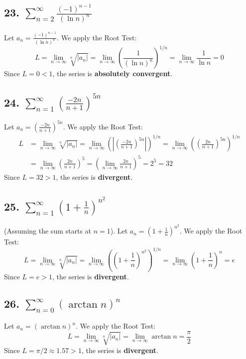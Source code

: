 \documentclass{article}
\begin{document}
\subsection*{23. $\sum_{n=2}^{\infty} \frac{(-1)^{n-1}}{(\ln n)^n}$}
Let $a_n = \frac{(-1)^{n-1}}{(\ln n)^n}$. We apply the Root Test:
\[ L = \lim_{n \to \infty} \sqrt[n]{|a_n|} = \lim_{n \to \infty} \left( \frac{1}{(\ln n)^n} \right)^{1/n} = \lim_{n \to \infty} \frac{1}{\ln n} = 0 \]
Since $L = 0 < 1$, the series is \textbf{absolutely convergent}.

\subsection*{24. $\sum_{n=1}^{\infty} \left(\frac{-2n}{n+1}\right)^{5n}$}
Let $a_n = \left(\frac{-2n}{n+1}\right)^{5n}$. We apply the Root Test:
\begin{align*}
L &= \lim_{n \to \infty} \sqrt[n]{|a_n|} = \lim_{n \to \infty} \left( \left|\left(\frac{-2n}{n+1}\right)^{5n}\right| \right)^{1/n} = \lim_{n \to \infty} \left( \left(\frac{2n}{n+1}\right)^{5n} \right)^{1/n} \\
&= \lim_{n \to \infty} \left(\frac{2n}{n+1}\right)^5 = \left(\lim_{n \to \infty} \frac{2n}{n+1}\right)^5 = 2^5 = 32
\end{align*}
Since $L = 32 > 1$, the series is \textbf{divergent}.

\subsection*{25. $\sum_{n=1}^{\infty} \left(1 + \frac{1}{n}\right)^{n^2}$}
(Assuming the sum starts at $n=1$). Let $a_n = \left(1 + \frac{1}{n}\right)^{n^2}$. We apply the Root Test:
\[ L = \lim_{n \to \infty} \sqrt[n]{|a_n|} = \lim_{n \to \infty} \left( \left(1 + \frac{1}{n}\right)^{n^2} \right)^{1/n} = \lim_{n \to \infty} \left(1 + \frac{1}{n}\right)^n = e \]
Since $L = e > 1$, the series is \textbf{divergent}.

\subsection*{26. $\sum_{n=0}^{\infty} (\arctan n)^n$}
Let $a_n = (\arctan n)^n$. We apply the Root Test:
\[ L = \lim_{n \to \infty} \sqrt[n]{|a_n|} = \lim_{n \to \infty} \arctan n = \frac{\pi}{2} \]
Since $L = \pi/2 \approx 1.57 > 1$, the series is \textbf{divergent}.
\end{document}

